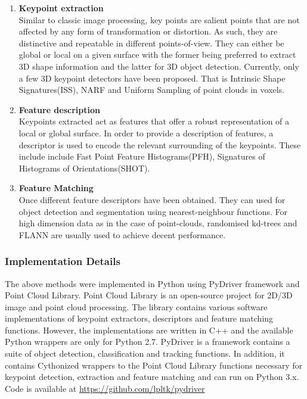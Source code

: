 \begin{enumerate}
	\item \textbf{Keypoint extraction} \\ 
	Similar to classic image processing, key points are salient points that are not affected by any form of transformation or distortion. As such, they are distinctive and repeatable in different points-of-view.  They can either be global or local on a given surface with the former being preferred to extract 3D shape information and the latter for 3D object detection. 
	Currently, only a few 3D keypoint detectors have been proposed. That is Intrinsic Shape Signatures(ISS)\cite{zhong2009intrinsic}, NARF\cite{steder2010narf} and Uniform Sampling of point clouds in voxels.
	\item \textbf{Feature description} \\ 
	Keypoints extracted act as features that offer a robust representation of a local or global surface. In order to provide a description of features, a descriptor is used to encode the relevant surrounding of the keypoints. These include include Fast Point Feature Histograms(PFH)\cite{rusu2009fast}, Signatures of Histograms of Orientations(SHOT)\cite{salti2014shot}. 
	
	\item \textbf{Feature Matching} \\
	Once different feature descriptors have been obtained. They can used for object detection and segmentation using nearest-neighbour functions. For high dimension data as in the case of point-clouds, randomised kd-trees and FLANN are usually used to achieve decent performance. 
		
\end{enumerate}

\subsubsection{Implementation Details}
The above methods were implemented in Python using PyDriver\cite{thesisSTUDIENARBEITPlotkin} framework and Point Cloud Library. 
Point Cloud Library is an open-source project for 2D/3D image and point cloud processing. The library contains various software implementations of keypoint extractors, descriptors and feature matching functions. However, the implementations are written in C++ and the available Python wrappers are only for Python 2.7. 
PyDriver is a framework contains a suite of object detection, classification and tracking functions. In addition, it contains Cythonized wrappers to the Point Cloud Library functions necessary for keypoint detection, extraction and feature matching and can run on Python 3.x. Code is available at \url{https://github.com/lpltk/pydriver}


